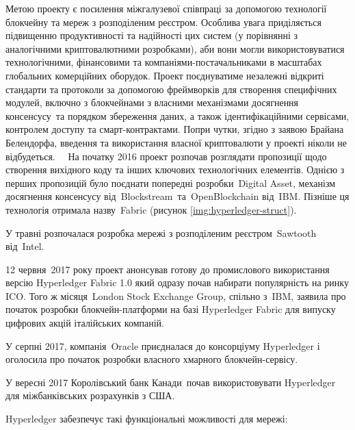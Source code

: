 \documentclass{lib/styles/default-style}
\begin{document}
    Метою проекту є посилення міжгалузевої співпраці за допомогою технології блокчейну та мереж з розподіленим реєстром.
    Особлива увага приділяється підвищенню продуктивності та надійності цих систем (у порівнянні з аналогічними криптовалютними розробками),
    аби вони могли використовуватися технологічними, фінансовими та компаніями-постачальниками в масштабах глобальних комерційних оборудок. 
    Проект поєднуватиме незалежні відкриті стандарти та протоколи за допомогою фреймворків для створення специфічних модулей, включно з 
    блокчейнами з власними механізмами досягнення консенсусу та порядком збереження даних, а також ідентифікаційними сервісами, контролем
    доступу та смарт-контрактами. 	Попри чутки, згідно з заявою Брайана Белендорфа, введення та використання власної криптовалюти у проекті
    ніколи не відбудеться.    На початку 2016 проект розпочав розглядати пропозиції щодо створення вихідного коду
    та інших ключових технологічних елементів. Однією з перших пропозицій було поєднати попередні розробки Digital Asset,
    механізм досягнення консенсусу від Blockstream та OpenBlockchain від IBM. Пізніше ця технологія отримала назву Fabric (рисунок \ref{img:hyperledger-struct}).
    

    У травні розпочалася розробка мережі з розподіленим реєстром Sawtooth від Intel. 

    12 червня 2017 року проект анонсував готову до промислового використання версію Hyperledger Fabric 1.0 який одразу 
    почав набирати популярність на ринку ICO. Того ж місяця London Stock Exchange Group, спільно з IBM, заявила про початок
    розробки блокчейн-платформи на базі Hyperledger Fabric для випуску цифрових акцій італійських компаній. 
    
    У серпні 2017, компанія Oracle приєдналася до консорціуму Hyperledger і  оголосила про початок розробки власного хмарного блокчейн-сервісу. 
    
    У вересні 2017 Королівський банк Канади почав використовувати Hyperledger для міжбанківських розрахунків з США. 
   
    Hyperledger забезпечує такі функціональні можливості для мережі:
    
\end{document}
